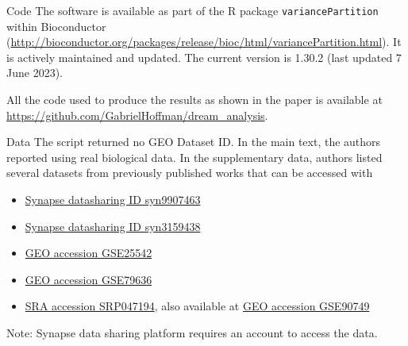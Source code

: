 \documentclass[10pt,a4paper]{article}
\newlength{\templength}
\newenvironment{ann_section}[1]
{\settowidth{\templength}{#1}%
\noindent\textbf{#1}
\hspace{1em}\begin{minipage}[t]{\dimexpr \linewidth-\the\templength-2em}}
{\end{minipage}\par\bigskip}
\begin{document}
\begin{ann_section}{Code}
The software is available as part of the R package \texttt{variancePartition} within Bioconductor (\url{http://bioconductor.org/packages/release/bioc/html/variancePartition.html}). It is actively maintained and updated. The current version is 1.30.2 (last updated 7 June 2023).

All the code used to produce the results as shown in the paper is available at \url{https://github.com/GabrielHoffman/dream_analysis}.
\end{ann_section}

\begin{ann_section}{Data}
The script returned no GEO Dataset ID. In the main text, the authors reported using real biological data. In the supplementary data, authors listed several datasets from previously published works that can be accessed with
\begin{itemize}
    \item \href{https://www.synapse.org/#!Synapse:syn9907463}{Synapse datasharing ID syn9907463}
    \item \href{https://www.synapse.org/#!Synapse:syn3159438}{Synapse datasharing ID syn3159438}
    \item \href{https://www.ncbi.nlm.nih.gov/geo/query/acc.cgi?acc=GSE25542}{GEO accession GSE25542}
    \item \href{https://www.ncbi.nlm.nih.gov/geo/query/acc.cgi?acc=GSE79636}{GEO accession GSE79636}
    \item \href{https://www.ncbi.nlm.nih.gov/sra?term=SRP047194}{SRA accession SRP047194}, also available at \href{https://www.ncbi.nlm.nih.gov/geo/query/acc.cgi?acc=GSE90749}{GEO accession GSE90749}
\end{itemize}

Note: Synapse data sharing platform requires an account to access the data.
\end{ann_section}
\end{document}
